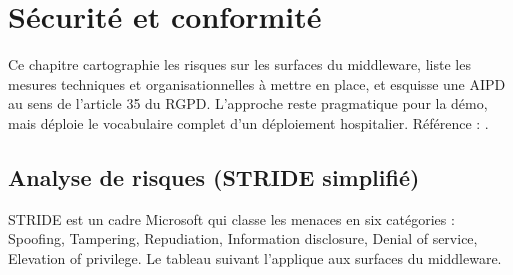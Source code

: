 \chapter{Sécurité et conformité}
\label{ch:securite-conformite}

Ce chapitre cartographie les risques sur les surfaces du middleware, liste les mesures techniques et organisationnelles à mettre en place, et esquisse une AIPD au sens de l'article 35 du RGPD. L'approche reste pragmatique pour la démo, mais déploie le vocabulaire complet d'un déploiement hospitalier. Référence : \cite{rgpd_2016_679}.

\section{Analyse de risques (STRIDE simplifié)}
\label{sec:securite-stride}

STRIDE est un cadre Microsoft qui classe les menaces en six catégories : Spoofing, Tampering, Repudiation, Information disclosure, Denial of service, Elevation of privilege. Le tableau suivant l'applique aux surfaces du middleware.

